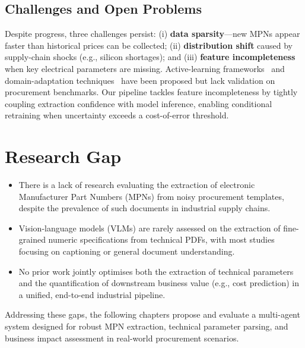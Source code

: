 \subsection{Challenges and Open Problems}
Despite progress, three challenges persist: (i) \textbf{data sparsity}—new MPNs appear faster than historical prices can be collected; (ii) \textbf{distribution shift} caused by supply-chain shocks (e.g., silicon shortages); and (iii) \textbf{feature incompleteness} when key electrical parameters are missing. Active-learning frameworks~\cite{settles2012active} and domain-adaptation techniques~\cite{wilson2020survey} have been proposed but lack validation on procurement benchmarks. Our pipeline tackles feature incompleteness by tightly coupling extraction confidence with model inference, enabling conditional retraining when uncertainty exceeds a cost-of-error threshold.

\section{Research Gap}
\begin{itemize}
  \item There is a lack of research evaluating the extraction of electronic Manufacturer Part Numbers (MPNs) from noisy procurement templates, despite the prevalence of such documents in industrial supply chains.
  \item Vision-language models (VLMs) are rarely assessed on the extraction of fine-grained numeric specifications from technical PDFs, with most studies focusing on captioning or general document understanding.
  \item No prior work jointly optimises both the extraction of technical parameters and the quantification of downstream business value (e.g., cost prediction) in a unified, end-to-end industrial pipeline.
\end{itemize}
Addressing these gaps, the following chapters propose and evaluate a multi-agent system designed for robust MPN extraction, technical parameter parsing, and business impact assessment in real-world procurement scenarios.
